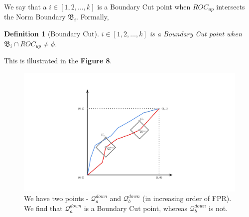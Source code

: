 \documentclass{article}
\newtheorem{definition}{Definition}[section]
\newcommand{\sg}[1]{ \textcolor{brown}{{\bf SG: }{``\em #1''}}}
\begin{document}



We say that a $i \in [1 ,2 , \hdots, k]$ is a Boundary Cut point when $ROC_{up}$ intersects the Norm Boundary $\mathfrak{B}_i$. Formally,
\begin{definition}[Boundary Cut] \label{def:BCut}
 $i \in [1 ,2 , \hdots, k]$ is a \emph{Boundary Cut point} when $\mathfrak{B}_i \cap ROC_{up} \neq \phi$.
\end{definition}
This is illustrated in the \textbf{Figure 8}.
\begin{figure}[!h]
    \centering
    \includegraphics[scale = 0.1]{diagrams/Boundary_Cut.jpg}
    \caption{We have two points - $\mathcal{Q}_a^{down}$ and $\mathcal{Q}_b^{down}$ (in increasing order of FPR). We find that $\mathcal{Q}_a^{down}$ is a Boundary Cut point, whereas $\mathcal{Q}_b^{down}$ is not.}
    \label{fig:enter-label}
\end{figure}
\end{document}
